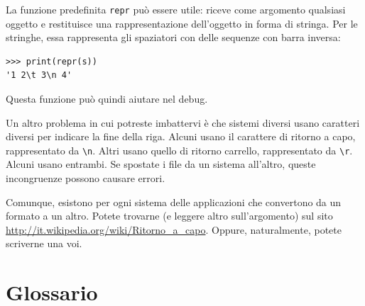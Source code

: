 \documentclass[10pt]{book}
\begin{document}
La funzione predefinita {\tt repr} può essere utile: riceve come argomento qualsiasi oggetto e restituisce una rappresentazione dell'oggetto in forma di stringa. Per le stringhe, essa rappresenta gli spaziatori con delle sequenze con barra inversa:

\begin{verbatim}
>>> print(repr(s))
'1 2\t 3\n 4'
\end{verbatim}

Questa funzione può quindi aiutare nel debug.

Un altro problema in cui potreste imbattervi è che sistemi diversi usano caratteri diversi per indicare la fine della riga. Alcuni usano il carattere di ritorno a capo, rappresentato da \verb"\n".  Altri usano quello di ritorno carrello, rappresentato da \verb"\r".  Alcuni usano entrambi. Se spostate i file da un sistema all'altro, queste incongruenze possono causare errori.

Comunque, esistono per ogni sistema delle applicazioni che convertono da un formato a un altro. Potete trovarne (e leggere altro sull'argomento) sul sito \url{http://it.wikipedia.org/wiki/Ritorno_a_capo}.  Oppure, naturalmente, potete scriverne una voi.


\section{Glossario}
\end{document}
